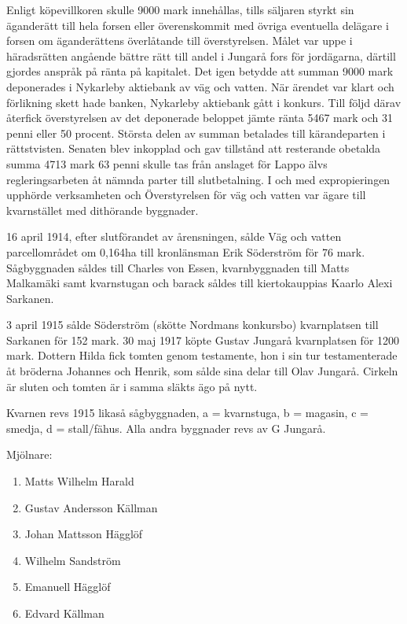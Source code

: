 Enligt köpevillkoren skulle 9000 mark innehållas, tills säljaren styrkt sin äganderätt till hela forsen eller överenskommit med övriga eventuella delägare i forsen om äganderättens överlåtande till överstyrelsen. Målet var uppe i häradsrätten angående bättre rätt till andel i Jungarå fors för jordägarna, därtill gjordes anspråk på ränta på kapitalet. Det igen betydde att summan 9000 mark deponerades i Nykarleby aktiebank av väg och vatten. När ärendet var klart och förlikning skett hade banken, Nykarleby aktiebank gått i konkurs. Till följd därav återfick överstyrelsen av det deponerade beloppet jämte ränta 5467 mark och 31 penni eller 50 procent. Största delen av summan betalades till kärandeparten i rättstvisten. Senaten blev inkopplad och gav tillstånd att resterande obetalda summa 4713 mark 63 penni skulle tas från anslaget för Lappo älvs regleringsarbeten åt nämnda parter till slutbetalning. I och med expropieringen upphörde verksamheten och Överstyrelsen för väg och vatten var ägare till kvarnstället med dithörande byggnader.

16 april 1914, efter slutförandet av årensningen, sålde Väg och vatten parcellområdet om 0,164ha till kronlänsman Erik Söderström för 76 mark. Sågbyggnaden såldes till Charles von Essen, kvarnbyggnaden till Matts Malkamäki samt kvarnstugan och barack såldes till kiertokauppias Kaarlo Alexi Sarkanen.

3 april 1915 sålde Söderström (skötte Nordmans konkursbo) kvarnplatsen till Sarkanen för 152 mark. 30 maj 1917 köpte Gustav Jungarå kvarnplatsen för 1200 mark. Dottern Hilda fick tomten genom testamente, hon i sin tur testamenterade åt bröderna Johannes och Henrik, som sålde sina delar till Olav Jungarå. Cirkeln är sluten och tomten är i samma släkts ägo på nytt.

Kvarnen revs 1915 likaså sågbyggnaden, a = kvarnstuga, b = magasin, c = smedja, d = stall/fähus. Alla andra byggnader revs av G Jungarå.

Mjölnare:
\begin{enumerate}
  \item Matts Wilhelm Harald
  \item Gustav Andersson Källman
  \item Johan Mattsson Hägglöf
  \item Wilhelm Sandström
  \item Emanuell Hägglöf
  \item Edvard Källman
\end{enumerate}



